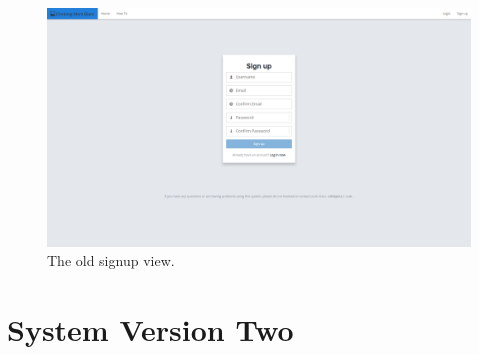\begin{figure}[h!]
    \centering
    \includegraphics[width=1.0\textwidth]{oldscreenshots/signup.png}
    \caption[]{The old signup view.}
    \label{fig:apdx-old-signup}
\end{figure}

\section{System Version Two}

